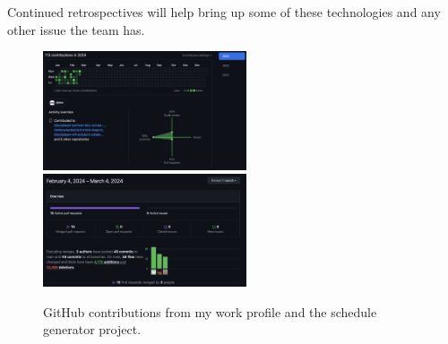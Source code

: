   Continued retrospectives will help bring up some of these technologies and any other issue the team has.

  \begin{figure}[H]
    \centering
    \includegraphics[width=6cm]{assets/outputs/githubContributions.png}
    \includegraphics[width=6cm]{assets/outputs/scheduleGeneratorChanges.png}

    \caption{GitHub contributions from my work profile and the schedule generator project.}
    \label{fig:githubStats}
  \end{figure}
  
\newpage
